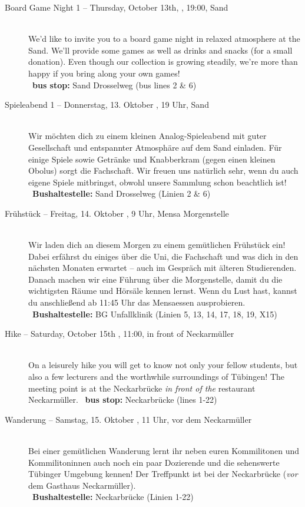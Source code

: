\begin{description}
\ifml
	\item[Board Game Night 1 -- Thursday, October 13th, \YEAR, 19:00, Sand]~\\
	We'd like to invite you to a board game night in relaxed atmosphere at the Sand.
    We'll provide some games as well as drinks and snacks (for a small donation).
    Even though our collection is growing steadily, we're more than happy if you bring along your own games!\\
	~\textbf{bus stop:} Sand Drosselweg (bus lines 2 \& 6)
\else
    \item[Spieleabend 1 -- Donnerstag, 13. Oktober \YEAR, 19 Uhr, Sand]~\\
	Wir möchten dich zu einem kleinen Analog-Spieleabend mit guter Gesellschaft und entspannter Atmosphäre auf dem Sand einladen.
    Für einige Spiele sowie Getränke und Knabberkram (gegen einen kleinen Obolus) sorgt die Fachschaft.
    Wir freuen uns natürlich sehr, wenn du auch eigene Spiele mitbringst, obwohl unsere Sammlung schon beachtlich ist!\\
	~\textbf{Bushaltestelle:} Sand Drosselweg (Linien 2 \& 6)
\fi

\ifbachelor
	\item[Frühstück -- Freitag, 14. Oktober \YEAR, 9 Uhr, Mensa Morgenstelle]\ \\
	Wir laden dich an diesem Morgen zu einem gemütlichen Frühstück ein! Dabei erfährst du einiges über die Uni, die Fachschaft und was dich in den nächsten Monaten erwartet -- auch im Gespräch mit älteren Studierenden.
	Danach machen wir eine Führung über die Morgenstelle, damit du die wichtigsten Räume und Hörsäle kennen lernst.
	Wenn du Lust hast, kannst du anschließend ab 11:45 Uhr das Mensaessen ausprobieren.\\
	~\textbf{Bushaltestelle:} BG Unfallklinik (Linien 5, 13, 14, 17, 18, 19, X15)
\fi

\ifml
	\item[Hike -- Saturday, October 15th \YEAR, 11:00, in front of Neckarmüller]~\\
	On a leisurely hike you will get to know not only your fellow students,
	but also a few lecturers and the worthwhile surroundings of Tübingen!
	The meeting point is at the Neckarbrücke \emph{in front of the} restaurant \glqq Neckarmüller\grqq.
	~\textbf{bus stop:} Neckarbrücke (lines 1-22)
\else
	\item[Wanderung -- Samstag, 15. Oktober \YEAR, 11 Uhr, vor dem Neckarmüller]~\\
	Bei einer gemütlichen Wanderung lernt ihr neben euren Kommilitonen und Kommilitoninnen auch
	noch ein paar Dozierende und die sehenswerte Tübinger Umgebung kennen!
	Der Treffpunkt ist bei der Neckarbrücke (\emph{vor} dem Gasthaus \glqq Neckarmüller\grqq).\\
	~\textbf{Bushaltestelle:} Neckarbrücke (Linien 1-22) 
\fi


\end{description}
